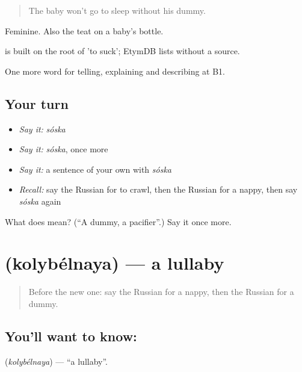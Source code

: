 \begin{quote}
The baby won't go to sleep without his dummy.
\end{quote}

Feminine. Also the teat on a baby's bottle.

\begin{cousinweb}
\emph{} is built on the root of \emph{} 'to suck'; EtymDB lists \emph{} without a source.
\end{cousinweb}

\begin{grammarlens}[title={What you've built}]
One more word for telling, explaining and describing at B1.
\end{grammarlens}

\subsection*{Your turn}
\begin{itemize}
\raggedright
  \item \emph{Say it:} \emph{sóska}
  \item \emph{Say it:} \emph{sóska}, once more
  \item \emph{Say it:} a sentence of your own with \emph{sóska}
  \item \emph{Recall:} say the Russian for to crawl, then the Russian for a nappy, then say \emph{sóska} again
\end{itemize}

\begin{tcolorbox}[breakable,colback=teal!4,colframe=teal!35!black,title={Before you move on}]
What does  mean? (\textquotedblleft{}A dummy, a pacifier\textquotedblright{}.) Say it once more.
\end{tcolorbox}
\section[\texorpdfstring{\ru{колыбельная} (kolybélnaya)}{колыбельная (kolybélnaya)}]{ (kolybélnaya) — a lullaby}

\label{lesson:RU-C496-kolybelnaya}



\begin{quote}
Before the new one: say the Russian for a nappy, then the Russian for a dummy.
\end{quote}

\subsection*{You'll want to know: }
\textbf{} (\emph{kolybélnaya}) — \textquotedblleft{}a lullaby\textquotedblright{}.

